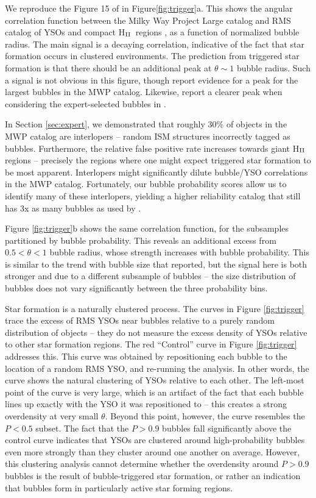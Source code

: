 \documentclass[preprint]{aastex}
\newcommand{\hii}[0]{H$_{\rm II}$}
\begin{document}
We reproduce the Figure 15 of \cite{Kendrew12} in Figure\ref{fig:trigger}a. This shows the angular correlation function between the Milky Way Project Large catalog and RMS catalog of YSOs and compact \hii\, regions \citep{RMS}, as a function of normalized bubble radius. The main signal is a decaying correlation, indicative of the fact that star formation occurs in clustered environments. The prediction from triggered star formation is that there should be an additional peak at $\theta \sim 1$ bubble radius. Such a signal is not obvious in this figure, though \cite{Kendrew12} report evidence for a peak for the largest bubbles in the MWP catalog. Likewise, \cite{Thompson12} report a clearer peak when considering the expert-selected bubbles in \cite{Churchwell06}. 

In Section \ref{sec:expert}, we demonstrated that roughly 30\% of objects in the MWP catalog are interlopers -- random ISM structures incorrectly tagged as bubbles. Furthermore, the relative false positive rate increases towards giant \hii\, regions -- precisely the regions where one might expect triggered star formation to be most apparent. Interlopers might significantly dilute bubble/YSO correlations in the MWP catalog. Fortunately, our bubble probability scores allow us to identify many of these interlopers, yielding a higher reliability catalog that still has 3x as many bubbles as used by \cite{Thompson12}.

Figure \ref{fig:trigger}b shows the same correlation function, for the subsamples partitioned by bubble probability. This reveals an additional excess from $0.5 < \theta < 1$ bubble radius, whose strength increases with bubble probability. This is similar to the trend with bubble size that \cite{Kendrew12} reported, but the signal here is both stronger and due to a different subsample of bubbles -- the size distribution of bubbles does not vary significantly between the three probability bins.

Star formation is a naturally clustered process. The curves in Figure \ref{fig:trigger} trace the excess of RMS YSOs near bubbles relative to a purely random distribution of objects -- they do not measure the excess density of YSOs relative to other star formation regions. The red ``Control'' curve in Figure \ref{fig:trigger} addresses this. This curve was obtained by repositioning each bubble to the location of a random RMS YSO, and re-running the analysis. In other words, the curve shows the natural clustering of YSOs relative to each other. The left-most point of the curve is very large, which is an artifact of the fact that each bubble lines up exactly with the YSO it was repositioned to -- this creates a strong overdensity at very small $\theta$. Beyond this point, however, the curve resembles the $P < 0.5$ subset. The fact that the $P > 0.9$ bubbles fall significantly above the control curve indicates that YSOs are clustered around high-probability bubbles even more strongly than they cluster around one another on average. However, this clustering analysis cannot determine whether the overdensity around $P > 0.9$ bubbles is the result of bubble-triggered star formation, or rather an indication that bubbles form in particularly active star forming regions. 
\end{document}

